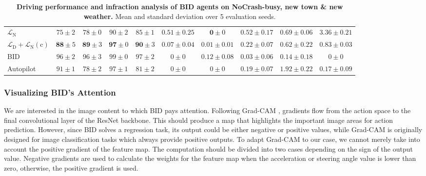 \begin{table}
\begin{tabular}{lccccccccc}
		$\mathcal{L}_\text{N}$
		& $75\pm2$ & $78\pm0$ & $90\pm2$ & $85\pm1$ 
		& $0.51\pm0.25$ & $\mathbf{0}\pm0$ & $0.52\pm0.17$ & $0.69\pm0.06$ & $3.36\pm0.21$ \\
		$\mathcal{L}_\text{D}+\mathcal{L}_\text{N}(\text{c})$
		& $\mathbf{88} \pm 5$ & $\mathbf{89} \pm 3$ & $\mathbf{97} \pm 0$ & $\mathbf{90} \pm 3$ 
		& $\mathbf{0.07} \pm 0.04$ & $0.01 \pm 0.01$ & $\mathbf{0.22} \pm 0.07$ & $\mathbf{0.62} \pm 0.22$ & $\mathbf{0.83} \pm 0.03$ \\
		\hline
		BID
		& $96 \pm 2$ & $96 \pm 3$ & $99 \pm 0$ & $97 \pm 2$ 
		& $0 \pm 0$ & $0.12 \pm 0.08$ & $0.03 \pm 0.06$ & $0.14 \pm 0.18$ & $0 \pm 0$ \\
		Autopilot
		& $91 \pm 1$ & $78 \pm 2$ & $97 \pm 1$ & $81 \pm 2$ 
		& $0 \pm 0$ & $0 \pm 0$ & $0.19 \pm 0.07$ & $1.92 \pm 0.22$ & $0.17 \pm 0.09$\\
		\hline
	\end{tabular}
	\vspace{-1ex}
	\caption{\textbf{Driving performance and infraction analysis of BID agents on NoCrash-busy, new town \& new weather.} 
		Mean and standard deviation over 5 evaluation seeds.}
	\vspace{-2.5ex}
	\label{table:infraction}
\end{table}


\subsubsection{Visualizing BID's Attention}
\label{sec:Visualization}
\hspace{1pc}We are interested in the image content to which BID pays attention. 
Following Grad-CAM \cite{Selvaraju:2017}, gradients flow from the action space to the final convolutional layer of the ResNet backbone. 
This should produce a map that highlights the important image areas for action prediction. 
However, since BID solves a regression task, its output could be either negative or positive values, while Grad-CAM is originally designed for image classification tasks which always provide positive outputs. 
To adapt Grad-CAM to our case, we cannot merely take into account the positive gradient of the feature map. 
The computation should be divided into two cases depending on the sign of the output value. 
Negative gradients are used to calculate the weights for the feature map when the acceleration or steering angle value is lower than zero, otherwise, the positive gradient is used.


